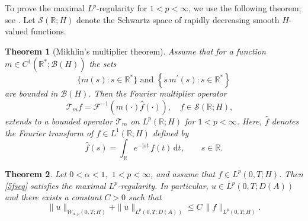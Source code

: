\documentclass[reqno]{amsart}
\newtheorem{theorem}{Theorem}[section]
\numberwithin{equation}{section}
\def \d {\mathrm{d}}
\begin{document}
To prove the maximal $L^p$-regularity for $1<p<\infty$, we use the following theorem; see \cite[Corollary 16]{Schw61}. Let $\mathcal{S}(\mathbb{R};H)$ denote the Schwartz space of rapidly decreasing smooth $H$-valued functions.
\begin{theorem}[Mikhlin's multiplier theorem]\label{mikh}
Assume that for a function $m \in C^1(\mathbb{R}^*;\mathcal{B}(H))$ the sets
$$
\{m(s): s \in \mathbb{R}^*\} \text { and }\left\{s\, m^{\prime}(s): s \in \mathbb{R}^*\right\}
$$
are bounded in $\mathcal{B}(H)$. Then the Fourier multiplier operator
$$
\mathcal{T}_m f=\mathcal{F}^{-1}(m(\cdot) \widehat{f}(\cdot)), \quad f \in \mathcal{S}(\mathbb{R};H),\quad
$$
extends to a bounded operator $\mathcal{T}_m$ on $L^p(\mathbb{R};H)$ for $1<p<\infty$. Here, $\widehat{f}$ denotes the Fourier transform of $f\in L^1(\mathbb{R};H)$ defined by
$$\widehat{f}(s)=\int_{\mathbb{R}} e^{-\mathrm{i}st}\,f(t)\,\d t, \qquad s\in \mathbb{R}.$$
\end{theorem}
\begin{theorem}\label{thmMRL^p}
Let $0<\alpha<1,$ $1<p<\infty$, and assume that $f\in L^p(0,T;H).$ Then \eqref{5fseq} satisfies the maximal $L^p$-regularity. In particular, $u\in L^p(0,T;D(A))$ and there exists a constant $C>0$ such that
\[
\|u\|_{W_{\alpha,p}(0,T;H)}+\|u\|_{L^p(0,T;D(A))}\le C\,\|f\|_{L^p(0,T;H)}.
\]
\end{theorem}
\end{document}
